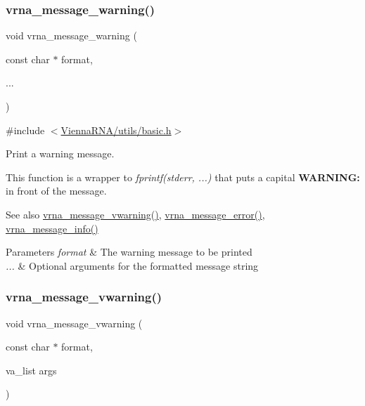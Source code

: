\subsubsection{\texorpdfstring{vrna\_message\_warning()}{vrna\_message\_warning()}}
{\footnotesize\ttfamily void vrna\+\_\+message\+\_\+warning (\begin{DoxyParamCaption}\item[{const char $\ast$}]{format,  }\item[{}]{... }\end{DoxyParamCaption})}



{\ttfamily \#include $<$\mbox{\hyperlink{utils_2basic_8h}{Vienna\+R\+N\+A/utils/basic.\+h}}$>$}



Print a warning message. 

This function is a wrapper to {\itshape fprintf(stderr, ...)} that puts a capital {\bfseries{W\+A\+R\+N\+I\+NG\+:}} in front of the message.

\begin{DoxySeeAlso}{See also}
\mbox{\hyperlink{group__message__utils_ga377aa8ec8a49d343063adb22e6311f26}{vrna\+\_\+message\+\_\+vwarning()}}, \mbox{\hyperlink{group__message__utils_ga36b35be01d7f36cf7f59c245eee628d1}{vrna\+\_\+message\+\_\+error()}}, \mbox{\hyperlink{group__message__utils_ga039bae6153a6415b054dbe6045f83d03}{vrna\+\_\+message\+\_\+info()}}
\end{DoxySeeAlso}

\begin{DoxyParams}{Parameters}
{\em format} & The warning message to be printed \\
\hline
{\em ...} & Optional arguments for the formatted message string \\
\hline
\end{DoxyParams}
\mbox{\label{group__message__utils_ga377aa8ec8a49d343063adb22e6311f26}} 
\subsubsection{\texorpdfstring{vrna\_message\_vwarning()}{vrna\_message\_vwarning()}}
{\footnotesize\ttfamily void vrna\+\_\+message\+\_\+vwarning (\begin{DoxyParamCaption}\item[{const char $\ast$}]{format,  }\item[{va\+\_\+list}]{args }\end{DoxyParamCaption})}



